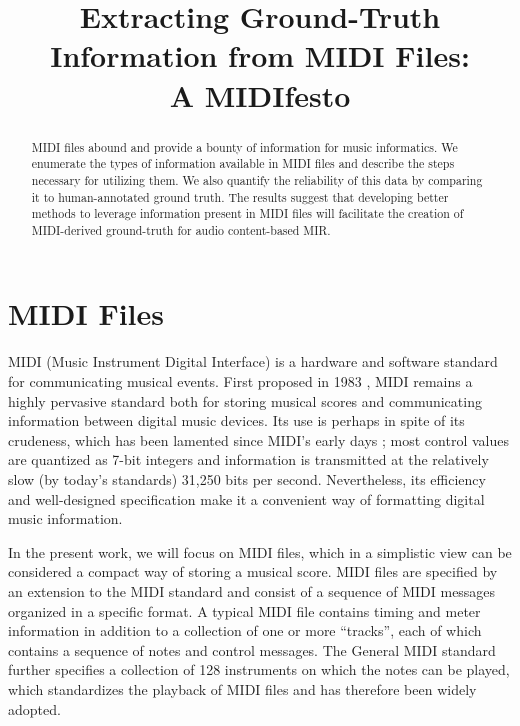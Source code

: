 \documentclass{article}
\title{Extracting Ground-Truth Information from MIDI Files:\\A MIDIfesto}
\begin{document}
\maketitle

\begin{abstract}
MIDI files abound and provide a bounty of information for music informatics.
We enumerate the types of information available in MIDI files and describe the steps necessary for utilizing them.
We also quantify the reliability of this data by comparing it to human-annotated ground truth.
The results suggest that developing better methods to leverage information present in MIDI files will facilitate the creation of MIDI-derived ground-truth for audio content-based MIR.
\end{abstract}

\section{MIDI Files}\label{sec:introduction}

MIDI (Music Instrument Digital Interface) is a hardware and software standard for communicating musical events.
First proposed in 1983 \cite{international1983midi}, MIDI remains a highly pervasive standard both for storing musical scores and communicating information between digital music devices.
Its use is perhaps in spite of its crudeness, which has been lamented since MIDI's early days \cite{moore1988dysfunctions}; most control values are quantized as 7-bit integers and information is transmitted at the relatively slow (by today's standards) 31,250 bits per second.
Nevertheless, its efficiency and well-designed specification make it a convenient way of formatting digital music information.

In the present work, we will focus on MIDI files, which in a simplistic view can be considered a compact way of storing a musical score.
MIDI files are specified by an extension to the MIDI standard \cite{international1988standard} and consist of a sequence of MIDI messages organized in a specific format.
A typical MIDI file contains timing and meter information in addition to a collection of one or more ``tracks'', each of which contains a sequence of notes and control messages.
The General MIDI standard further specifies a collection of 128 instruments on which the notes can be played, which standardizes the playback of MIDI files and has therefore been widely adopted.
\end{document}
